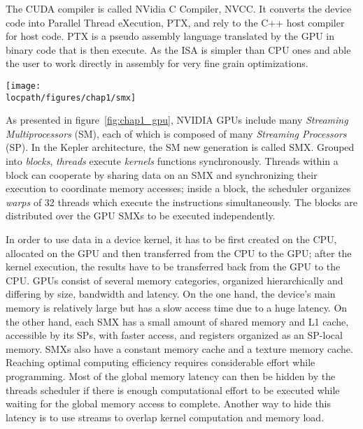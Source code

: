 The CUDA compiler is called NVidia C Compiler, NVCC. 
It converts the device code into Parallel Thread eXecution, PTX, and rely to the C++ host compiler for host code. 
PTX is a pseudo assembly language translated by the GPU in binary code that is then execute. 
As the ISA is simpler than CPU ones and able the user to work directly in assembly for very fine grain optimizations. 

\begin{figure*}[t!]
\centering
\setlength\fboxsep{0pt}
\setlength\fboxrule{0.25pt}
\texttt{[image: \\locpath/figures/chap1/smx]}
\caption{NVIDIA GPU and CUDA architecture overview}
 \label{fig:chap1_gpu}
\end{figure*}

As presented in figure~\ref{fig:chap1_gpu}, NVIDIA GPUs include many \emph{Streaming Multiprocessors} (SM), each of which is composed of many \emph{Streaming Processors} (SP). In the Kepler architecture, the SM new generation is called SMX.
%
Grouped into \emph{blocks}, \textit{threads} execute \emph{kernels} functions synchronously.
Threads within a block can cooperate by sharing data on an SMX and synchronizing their execution to coordinate memory accesses; inside a block, the scheduler organizes \emph{warps} of 32 threads which execute the instructions simultaneously.
The blocks are distributed over the GPU SMXs to be executed independently.

In order to use data in a device kernel, it has to be first created on the CPU, allocated on the GPU and then transferred from the CPU to the GPU; after the kernel execution, the results have to be transferred back from the GPU to the CPU. 
GPUs consist of several memory categories, organized hierarchically and differing by size, bandwidth and latency.   
On the one hand, the device's main memory is relatively large but has a slow access time due to a huge latency. 
On the other hand, each SMX has a small amount of shared memory and L1 cache, accessible by its SPs, with faster access, and registers organized as an SP-local memory. 
SMXs also have a constant memory cache and a texture memory cache.
Reaching optimal computing efficiency requires considerable effort while programming.
Most of the global memory latency can then be hidden by the threads scheduler if there is enough computational effort to be executed while waiting for the global memory access to complete. Another way to hide this latency is to use streams to overlap kernel computation and memory load. 

